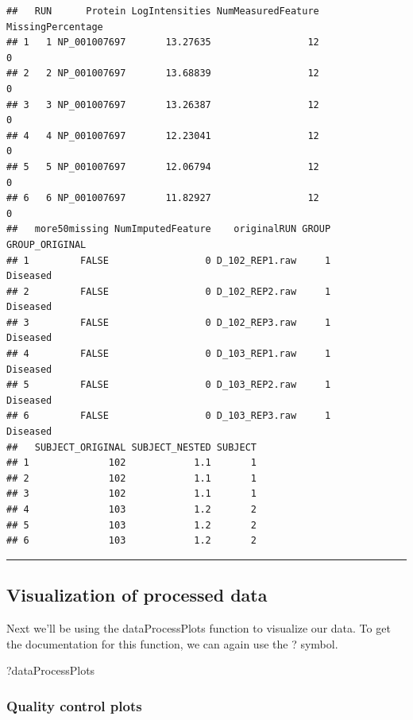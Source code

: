 \documentclass[]{book}
\newenvironment{Shaded}{\begin{snugshade}}{\end{snugshade}}
\newcommand{\NormalTok}[1]{#1}
\begin{document}
\begin{verbatim}
##   RUN      Protein LogIntensities NumMeasuredFeature MissingPercentage
## 1   1 NP_001007697       13.27635                 12                 0
## 2   2 NP_001007697       13.68839                 12                 0
## 3   3 NP_001007697       13.26387                 12                 0
## 4   4 NP_001007697       12.23041                 12                 0
## 5   5 NP_001007697       12.06794                 12                 0
## 6   6 NP_001007697       11.82927                 12                 0
##   more50missing NumImputedFeature    originalRUN GROUP GROUP_ORIGINAL
## 1         FALSE                 0 D_102_REP1.raw     1       Diseased
## 2         FALSE                 0 D_102_REP2.raw     1       Diseased
## 3         FALSE                 0 D_102_REP3.raw     1       Diseased
## 4         FALSE                 0 D_103_REP1.raw     1       Diseased
## 5         FALSE                 0 D_103_REP2.raw     1       Diseased
## 6         FALSE                 0 D_103_REP3.raw     1       Diseased
##   SUBJECT_ORIGINAL SUBJECT_NESTED SUBJECT
## 1              102            1.1       1
## 2              102            1.1       1
## 3              102            1.1       1
## 4              103            1.2       2
## 5              103            1.2       2
## 6              103            1.2       2
\end{verbatim}

\begin{center}\rule{0.5\linewidth}{\linethickness}\end{center}

\hypertarget{visualization-of-processed-data}{%
\subsection{Visualization of processed data}\label{visualization-of-processed-data}}

Next we'll be using the dataProcessPlots function to visualize our data. To get the documentation for this function, we can again use the ? symbol.

\begin{Shaded}
\begin{Highlighting}[]
\NormalTok{?dataProcessPlots}
\end{Highlighting}
\end{Shaded}

\hypertarget{quality-control-plots}{%
\subsubsection{Quality control plots}\label{quality-control-plots}}
\end{document}
